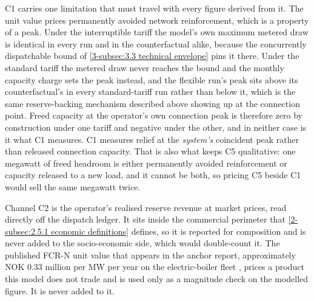 C1 carries one limitation that must travel with every figure derived from it. The unit value prices permanently avoided network reinforcement, which is a property of a peak. Under the interruptible tariff the model's own maximum metered draw is identical in every run and in the counterfactual alike, because the concurrently dispatchable bound of \autoref{3-subsec:3.3 technical envelope} pins it there. Under the standard tariff the metered draw never reaches the bound and the monthly capacity charge sets the peak instead, and the flexible run's peak sits above its counterfactual's in every standard-tariff run rather than below it, which is the same reserve-backing mechanism described above showing up at the connection point. Freed capacity at the operator's own connection peak is therefore zero by construction under one tariff and negative under the other, and in neither case is it what C1 measures. C1 measures relief at the \emph{system's} coincident peak rather than released connection capacity. That is also what keeps C5 qualitative: one megawatt of freed headroom is either permanently avoided reinforcement or capacity released to a new load, and it cannot be both, so pricing C5 beside C1 would sell the same megawatt twice.

Channel C2 is the operator's realised reserve revenue at market prices, read directly off the dispatch ledger. It sits inside the commercial perimeter that \autoref{2-subsec:2.5.1 economic definitions} defines, so it is reported for composition and is never added to the socio-economic side, which would double-count it. The published FCR-N unit value that appears in the anchor report, approximately NOK 0.33 million per MW per year on the electric-boiler fleet \cite{Thema_fjernvarme_2024}, prices a product this model does not trade and is used only as a magnitude check on the modelled figure. It is never added to it.

